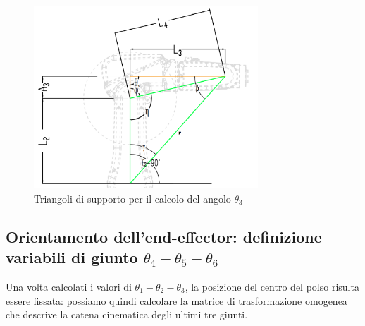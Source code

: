 \begin{figure}[h]
	\centering
	\includegraphics[width=0.75\textwidth]{Immagini/Theta_3}
	\caption{Triangoli di supporto per il calcolo del angolo $\theta_3$} 
	\label{fig:CalcoloTheta3}
\end{figure}



\subsection{Orientamento dell'end-effector: definizione variabili di giunto $\theta_4 - \theta_5 - \theta_6$}
Una volta calcolati i valori di $\theta_1 - \theta_2 - \theta_3$, la posizione del centro del polso risulta essere fissata: possiamo quindi calcolare la matrice di trasformazione omogenea che descrive la catena cinematica degli ultimi tre giunti.

